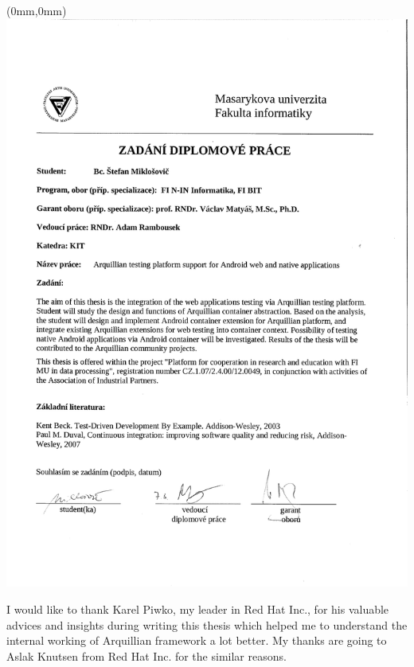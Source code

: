 \documentclass[12pt,final,oneside]{fithesis}
\begin{document}
\FrontMatter
\ThesisTitlePage

\newpage
\thispagestyle{empty}
\begin{textblock*}{\paperwidth}(0mm,0mm)
   \noindent\includegraphics[width=\paperwidth,height=\paperheight]{resources/zadanie.pdf}
\end{textblock*}
\mbox{}\newpage

\begin{ThesisDeclaration}
\DeclarationText
\AdvisorName
\end{ThesisDeclaration}

\begin{ThesisThanks}
I would like to thank Karel Piwko, my leader in Red Hat Inc., for his valuable advices and insights during writing this thesis which helped me to understand the internal working of Arquillian framework a lot better. My thanks are going to Aslak Knutsen from Red Hat Inc. for the similar reasons.
\end{ThesisThanks}
\end{document}
